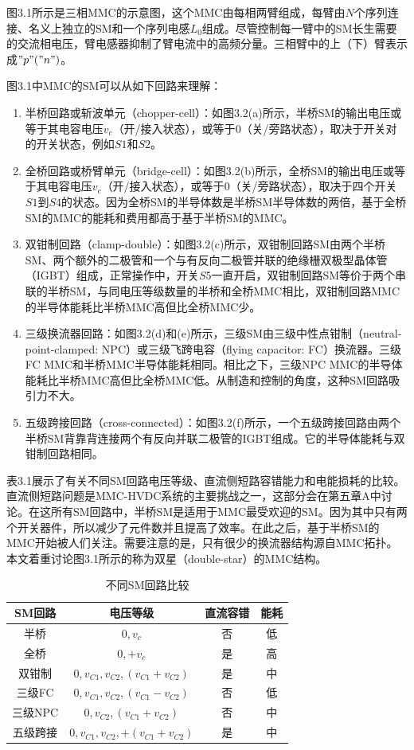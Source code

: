   图3.1所示是三相MMC的示意图，这个MMC由每相两臂组成，每臂由$N$个序列连接、名义上独立的SM和一个序列电感$L_0$组成。尽管控制每一臂中的SM长生需要的交流相电压，臂电感器抑制了臂电流中的高频分量。三相臂中的上（下）臂表示成$"p"("n")$。
  
  图3.1中MMC的SM可以从如下回路来理解：
  \begin{enumerate}[1)]
  \item 半桥回路或斩波单元（chopper-cell）：如图3.2(a)所示，半桥SM的输出电压或等于其电容电压$v_c$（开/接入状态），或等于$0$（关/旁路状态），取决于开关对的开关状态，例如$S1$和$S2$。
  \item 全桥回路或桥臂单元（bridge-cell）：如图3.2(b)所示，全桥SM的输出电压或等于其电容电压$v_c$（开/接入状态），或等于$0$（关/旁路状态），取决于四个开关$S1$到$S4$的状态。因为全桥SM的半导体数是半桥SM半导体数的两倍，基于全桥SM的MMC的能耗和费用都高于基于半桥SM的MMC。
  \item 双钳制回路（clamp-double）：如图3.2(c)所示，双钳制回路SM由两个半桥SM、两个额外的二极管和一个与有反向二极管并联的绝缘栅双极型晶体管（IGBT）组成，正常操作中，开关$S5$一直开启，双钳制回路SM等价于两个串联的半桥SM，与同电压等级数量的半桥和全桥MMC相比，双钳制回路MMC的半导体能耗比半桥MMC高但比全桥MMC少。
  \item 三级换流器回路：如图3.2(d)和(e)所示，三级SM由三级中性点钳制（neutral-point-clamped: NPC）或三级飞跨电容（flying capacitor: FC）换流器。三级FC MMC和半桥MMC半导体能耗相同。相比之下，三级NPC MMC的半导体能耗比半桥MMC高但比全桥MMC低。从制造和控制的角度，这种SM回路吸引力不大。
  \item 五级跨接回路（cross-connected）：如图3.2(f)所示，一个五级跨接回路由两个半桥SM背靠背连接两个有反向并联二极管的IGBT组成。它的半导体能耗与双钳制回路相同。
  \end{enumerate}
  
  表3.1展示了有关不同SM回路电压等级、直流侧短路容错能力和电能损耗的比较。直流侧短路问题是MMC-HVDC系统的主要挑战之一，这部分会在第五章A中讨论。在这所有SM回路中，半桥SM是适用于MMC最受欢迎的SM。因为其中只有两个开关器件，所以减少了元件数并且提高了效率。在此之后，基于半桥SM的MMC开始被人们关注。需要注意的是，只有很少的换流器结构源自MMC拓扑。本文着重讨论图3.1所示的称为双星（double-star）的MMC结构。
  
\begin{table}[h]
\centering
\begin{tabular}{cccc}
\toprule
SM回路 & 电压等级 & 直流容错 & 能耗\\
\midrule
半桥 & $0, v_c$ & 否 & 低 \\ 
全桥 & $0, +v_c$ & 是 & 高 \\ 
双钳制 & $0, v_{C1}, v_{C2}, (v_{C1} + v_{C2})$ & 是 & 中 \\ 
三级FC & $0, v_{C1}, v_{C2}, (v_{C1} - v_{C2})$ & 否 & 低 \\ 
三级NPC & $0, v_{C2}, (v_{C1} + v_{C2})$ & 否 & 中 \\ 
五级跨接 & $0, v_{C1}, v_{C2}, +(v_{C1} + v_{C2})$ & 是 & 中 \\ 
\bottomrule
\end{tabular}
\caption{不同SM回路比较}
\end{table}
  
